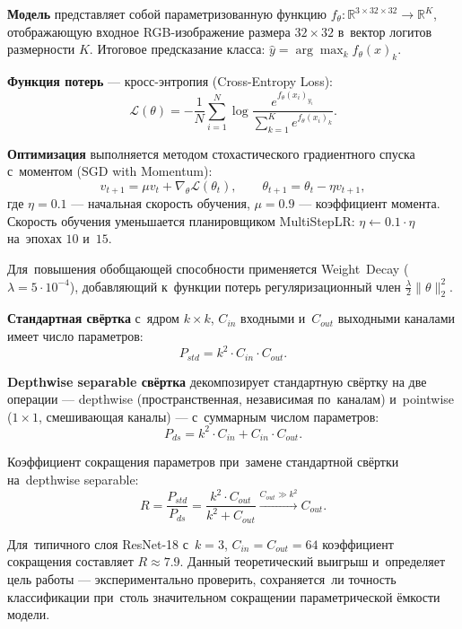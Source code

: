 \textbf{Модель} представляет собой параметризованную функцию $f_\theta: \mathbb{R}^{3 \times 32 \times 32} \to \mathbb{R}^{K}$, отображающую входное RGB-изображение размера $32 \times 32$ в~вектор логитов размерности $K$. Итоговое предсказание класса: $\hat{y} = \arg\max_{k} f_\theta(x)_k$.

\textbf{Функция потерь} — кросс-энтропия (Cross-Entropy Loss):
\begin{equation}
    \mathcal{L}(\theta) = -\frac{1}{N} \sum_{i=1}^{N} \log \frac{e^{f_\theta(x_i)_{y_i}}}{\sum_{k=1}^{K} e^{f_\theta(x_i)_k}}.
\end{equation}

\textbf{Оптимизация} выполняется методом стохастического градиентного спуска с~моментом (SGD with Momentum):
\begin{equation}
    v_{t+1} = \mu v_t + \nabla_\theta \mathcal{L}(\theta_t), \qquad \theta_{t+1} = \theta_t - \eta v_{t+1},
\end{equation}
где $\eta = 0.1$ — начальная скорость обучения, $\mu = 0.9$ — коэффициент момента. Скорость обучения уменьшается планировщиком MultiStepLR: $\eta \leftarrow 0.1 \cdot \eta$ на~эпохах $10$ и~$15$.

Для~повышения обобщающей способности применяется Weight~Decay ($\lambda = 5 \cdot 10^{-4}$), добавляющий к~функции потерь регуляризационный член $\frac{\lambda}{2} \|\theta\|_2^2$.

\textbf{Стандартная свёртка} с~ядром $k \times k$, $C_{in}$ входными и~$C_{out}$ выходными каналами имеет число параметров:
\begin{equation}
    P_{std} = k^2 \cdot C_{in} \cdot C_{out}.
\end{equation}

\textbf{Depthwise separable свёртка} декомпозирует стандартную свёртку на две операции — depthwise (пространственная, независимая по~каналам) и~pointwise ($1 \times 1$, смешивающая каналы) — с~суммарным числом параметров:
\begin{equation}
    P_{ds} = k^2 \cdot C_{in} + C_{in} \cdot C_{out}.
\end{equation}

Коэффициент сокращения параметров при~замене стандартной свёртки на~depthwise separable:
\begin{equation}
    R = \frac{P_{std}}{P_{ds}} = \frac{k^2 \cdot C_{out}}{k^2 + C_{out}} \xrightarrow{C_{out} \gg k^2} C_{out}.
\end{equation}

Для~типичного слоя ResNet-18 с~$k = 3$, $C_{in} = C_{out} = 64$ коэффициент сокращения составляет $R \approx 7.9$. Данный теоретический выигрыш и~определяет цель работы — экспериментально проверить, сохраняется~ли точность классификации при~столь значительном сокращении параметрической ёмкости модели.

